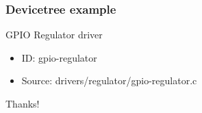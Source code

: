 \documentclass{beamer}
\begin{document}
\begin{frame}
\frametitle{Devicetree example}
GPIO Regulator driver
\begin{itemize}
	\item ID: gpio-regulator
	\item Source: drivers/regulator/gpio-regulator.c
\end{itemize}
\end{frame}


\begin{frame}
\Huge{\centerline{Thanks!}}
\end{frame}
\end{document}
